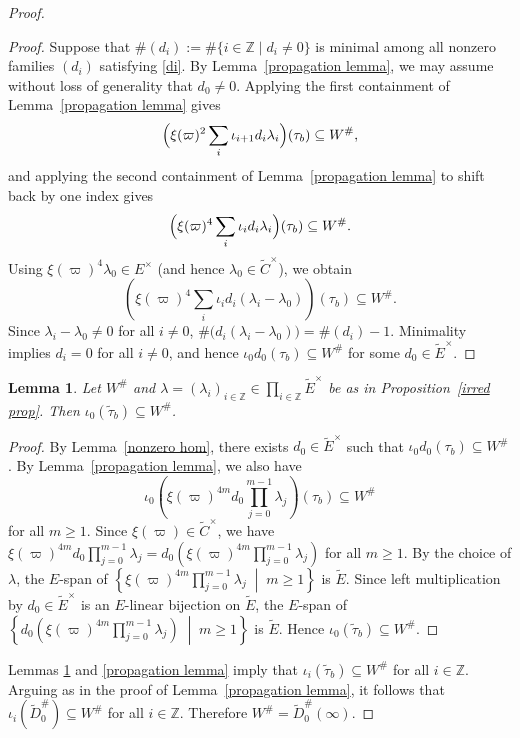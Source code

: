 \documentclass[a4paper,10pt,twoside]{amsart}
\newtheorem{lemma}[theorem]{Lemma}
\theoremstyle{definition}
\numberwithin{equation}{section}
\begin{document}
\begin{proof}
\begin{proof}
Suppose that $\#(d_i):=\#\{i\in\mathbb Z\mid d_i\neq0\}$ is minimal among all nonzero families \((d_i)\) satisfying \eqref{di}. By Lemma~\ref{propagation lemma}, we may assume without loss of generality that \(d_0\neq0\).
Applying the first containment of
Lemma~\ref{propagation lemma} gives
\[
\Bigl(\xi(\varpi)^2
\sum_i\iota_{i+1}d_i\lambda_i\Bigr)(\tau_b)
\subseteq W^\#,
\]
and applying the second containment of
Lemma~\ref{propagation lemma} to shift back by one
index gives
\[
\Bigl(\xi(\varpi)^4
\sum_i\iota_i d_i\lambda_i\Bigr)(\tau_b)
\subseteq W^\#.
\]
Using \(\xi(\varpi)^4\lambda_0\in E^\times\)
(and hence \(\lambda_0\in\widetilde C^\times\)), we obtain
\[
\left(
\xi(\varpi)^4
\sum_i\iota_i d_i(\lambda_i-\lambda_0)
\right)(\tau_b)\subseteq W^\#.
\]
Since \(\lambda_i-\lambda_0\neq0\) for all \(i\neq0\), $\#\bigl(d_i(\lambda_i-\lambda_0)\bigr)=\#(d_i)-1$. Minimality implies \(d_i=0\) for all \(i\neq0\), and hence $\iota_0d_0(\tau_b)\subseteq W^\#$ for some $d_0\in\widetilde E^\times$.
\end{proof}

\begin{lemma}\label{i_0 tilde}
Let \(W^\#\) and $\lambda=(\lambda_i)_{i\in\mathbb Z}
\in\prod_{i\in\mathbb Z}\widetilde{E}^{\times}$ be as in Proposition~\ref{irred prop}. Then \(\iota_0(\widetilde\tau_b)\subseteq W^\#\).
\end{lemma}

\begin{proof}
By Lemma~\ref{nonzero hom}, there exists \(d_0\in\widetilde E^\times\)
such that \(\iota_0d_0(\tau_b)\subseteq W^\#\). By
Lemma~\ref{propagation lemma}, we also have
\[
\iota_0\!\left(\xi(\varpi)^{4m}d_0\prod_{j=0}^{m-1}\lambda_j\right)
(\tau_b)\subseteq W^\#
\]
for all \(m\ge1\). Since \(\xi(\varpi)\in\widetilde C^\times\), we have
\(\xi(\varpi)^{4m}d_0\prod_{j=0}^{m-1}\lambda_j
=d_0 \left( \xi(\varpi)^{4m}\prod_{j=0}^{m-1}\lambda_j\right)\) for all \(m\ge1\). By the choice of \(\lambda\), the \(E\)-span of $\left\{
\xi(\varpi)^{4m}\prod_{j=0}^{m-1}\lambda_j
\;\middle|\;
m\ge1
\right\}$ is \(\widetilde E\). Since left multiplication by \(d_0\in\widetilde E^\times\) is an \(E\)-linear bijection on \(\widetilde E\), the \(E\)-span of $\left\{d_0\left(\xi(\varpi)^{4m}\prod_{j=0}^{m-1}\lambda_j\right)
\;\middle|\;
m\ge1
\right\}
$ is \(\widetilde E\). Hence \(\iota_0(\widetilde\tau_b)\subseteq W^\#\).
\end{proof}


Lemmas \ref{i_0 tilde} and \ref{propagation lemma} imply that $\iota_i(\widetilde{\tau}_b) \subseteq W^\#$ for all $i \in \mathbb{Z}$. 
Arguing as in the proof of Lemma~\ref{propagation lemma}, it follows 
that $\iota_i(\widetilde{D}_0^\#) \subseteq W^\#$ for all $i \in \mathbb{Z}$. 
Therefore $W^\# = \widetilde{D}_0^\#(\infty)$.
\end{proof}
\end{document}
